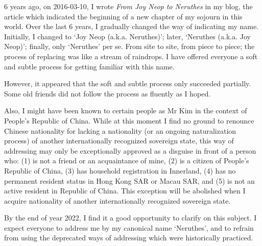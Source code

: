 
6 years ago, on 2016-03-10, I wrote \textit{From Joy Neop to Neruthes} in my blog,
the article which indicated the beginning of a new chapter of my sojourn in this world.
Over the last 6 years, I gradually changed the way of indicating my name.
Initially, I changed to `Joy Neop (a.k.a. Neruthes)'; later, `Neruthes (a.k.a. Joy Neop)';
finally, only `Neruthes' per se.
From site to site, from piece to piece;
the process of replacing was like a stream of raindrops.
I have offered everyone a soft and subtle process for getting familiar with this name.

However, it appeared that the soft and subtle process only succeeded partially.
Some old friends did not follow the process as fluently as I hoped.

Also, I might have been known to certain people as Mr Kim in the context of People's Republic of China.
While at this moment I find no ground to renounce Chinese nationality for lacking a nationality (or an ongoing naturalization process)
of another internationally recognized sovereign state,
this way of addressing may only be exceptionally approved as a disguise in front of a person who:
(1) is not a friend or an acquaintance of mine,
(2) is a citizen of People's Republic of China,
(3) has household registration in Innerland,
(4) has no permanent resident status in Hong Kong SAR or Macau SAR, and
(5) is not an active resident in Republic of China.
This exception will be abolished when I acquire nationality of another internationally recognized sovereign state.

By the end of year 2022, I find it a good opportunity to clarify on this subject.
I expect everyone to address me by my canonical name `Neruthes',
and to refrain from using the deprecated ways of addressing which were historically practiced.
